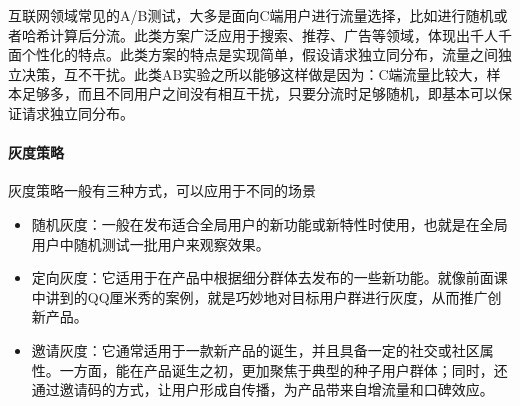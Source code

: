 \documentclass[letterpaper,10pt,english]{sphinxmanual}
\begin{document}
互联网领域常见的A/B测试，大多是面向C端用户进行流量选择，比如进行随机或者哈希计算后分流。此类方案广泛应用于搜索、推荐、广告等领域，体现出千人千面个性化的特点。此类方案的特点是实现简单，假设请求独立同分布，流量之间独立决策，互不干扰。此类AB实验之所以能够这样做是因为：C端流量比较大，样本足够多，而且不同用户之间没有相互干扰，只要分流时足够随机，即基本可以保证请求独立同分布。%
\begin{footnote}[979]\sphinxAtStartFootnote
{}
%
\end{footnote}

%
\begin{footnote}[980]\sphinxAtStartFootnote
{}
%
\end{footnote}


\paragraph{灰度策略}
\label{\detokenize{chapter_AI_dive/huidu:id2}}
灰度策略一般有三种方式，可以应用于不同的场景%
\begin{footnote}[981]\sphinxAtStartFootnote
{}
%
\end{footnote}
\begin{itemize}
\item {} 
随机灰度：一般在发布适合全局用户的新功能或新特性时使用，也就是在全局用户中随机测试一批用户来观察效果。

\item {} 
定向灰度：它适用于在产品中根据细分群体去发布的一些新功能。就像前面课中讲到的QQ厘米秀的案例，就是巧妙地对目标用户群进行灰度，从而推广创新产品。

\item {} 
邀请灰度：它通常适用于一款新产品的诞生，并且具备一定的社交或社区属性。一方面，能在产品诞生之初，更加聚焦于典型的种子用户群体；同时，还通过邀请码的方式，让用户形成自传播，为产品带来自增流量和口碑效应。

\end{itemize}
\end{document}
